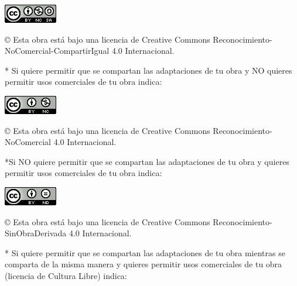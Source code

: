 \documentclass[a4paper,12pt,oneside]{report}
\begin{document}
\begin{center}
\includegraphics[scale=1.8]{images/by-nc-sa_88x31}\\[5mm]
\end{center}

\begin{large}
© Esta obra está bajo una licencia de Creative Commons Reconocimiento-NoComercial-CompartirIgual 4.0 Internacional.
\end{large}

\bigskip
\bigskip
\bigskip
* Si quiere permitir que se compartan las adaptaciones de tu obra y NO quieres permitir usos comerciales de tu obra indica:

\begin{center}
\includegraphics[scale=1.8]{images/by-nc_88x31}\\[5mm]
\end{center}

\begin{large}
© Esta obra está bajo una licencia de Creative Commons Reconocimiento-NoComercial 4.0 Internacional.
\end{large}

\newpage
\thispagestyle{empty}

\bigskip
*Si NO quiere permitir que se compartan las adaptaciones de tu obra y quieres permitir usos comerciales de tu obra indica:

\begin{center}
\includegraphics[scale=1.8]{images/by-nd_88x31}\\[5mm]
\end{center}

\begin{large}
© Esta obra está bajo una licencia de Creative Commons Reconocimiento-SinObraDerivada 4.0 Internacional.
\end{large}

\bigskip
\bigskip
\bigskip
* Si quiere permitir que se compartan las adaptaciones de tu obra mientras se comparta de la misma manera y quieres permitir usos comerciales de tu obra (licencia de Cultura Libre) indica:
\end{document}
